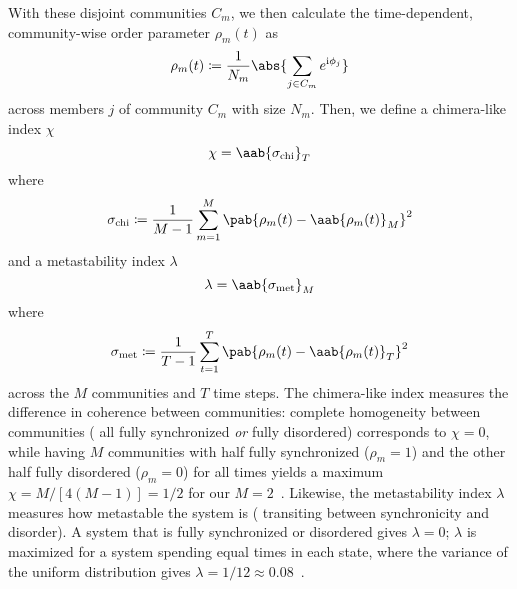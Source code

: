 \documentclass[pdflatex,lineno,referee,sn-nature]{sn-jnl}
\begin{document}
With these disjoint communities $C_m$, we then calculate
the time-dependent, community-wise order parameter $\rho_m(t)$
as
\begin{equation}
  \rho_m(t) \coloneqq \frac{1}{N_m} \abs{\sum_{j \in C_m} e^{\im \phi_j}}
\end{equation}
across members $j$ of community $C_m$ with size $N_m$.
Then, we define a chimera-like index $\chi$
\begin{equation}
  \chi = \aab{
    \sigma_{\text{chi}}}_T
  \label{eq:chimera_index}
\end{equation}
where
\begin{equation*}
    \sigma_{\text{chi}} \coloneqq \frac{1}{M-1} \sum_{m=1}^M
    \pab{\rho_m(t) - \aab{\rho_m(t)}_M}^2
\end{equation*}
and a metastability index $\lambda$
\begin{equation}
  \lambda = \aab{
    \sigma_{\text{met}}}_M
  \label{eq:metastability_index}
\end{equation}
where
\begin{equation*}
    \sigma_{\text{met}} \coloneqq \frac{1}{T-1} \sum_{t=1}^T
    \pab{\rho_m(t) - \aab{\rho_m(t)}_T}^2
\end{equation*}
across the $M$ communities and $T$ time steps.
The chimera-like index measures the difference in coherence between communities:
complete homogeneity between communities
(\eg{} all fully synchronized \emph{or} fully disordered)
corresponds to $\chi = 0$,
while having $M$ communities
with half fully synchronized ($\rho_m = 1$)
and the other half fully disordered ($\rho_m = 0$)
for all times yields a maximum $\chi = M/[4(M-1)]
= 1/2$ for our $M=2$\approx~\citep{shanahan2010metastable}.
Likewise, the metastability index $\lambda$ measures how metastable
the system is (\ie{} transiting between synchronicity and disorder).
A system that is fully synchronized or disordered gives $\lambda = 0$;
$\lambda$ is maximized for a system spending equal times in each state,
where the variance of the uniform distribution gives
$\lambda = 1/12 \approx \num{0.08}$~\citep{shanahan2010metastable}.


\backmatter{}



\appendix
\onecolumn

\end{document}

